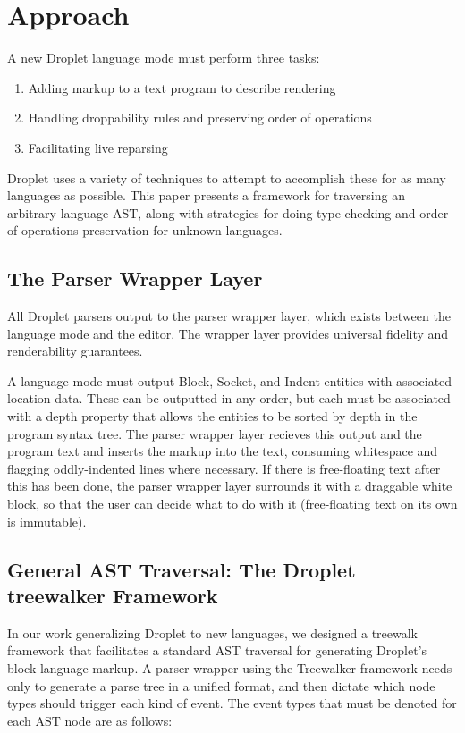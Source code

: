 \documentclass[conference]{IEEEtran}
\begin{document}
\section{Approach}
A new Droplet language mode must perform three tasks:
\begin{enumerate}
  \item Adding markup to a text program to describe rendering
  \item Handling droppability rules and preserving order of operations
  \item Facilitating live reparsing
\end{enumerate}

Droplet uses a variety of techniques to attempt to accomplish these for as many languages as possible. This paper presents a framework for traversing an arbitrary language AST, along with strategies for doing type-checking and order-of-operations preservation for unknown languages.

\subsection{The Parser Wrapper Layer}
All Droplet parsers output to the parser wrapper layer, which exists between the language mode and the editor. The wrapper layer provides universal fidelity and renderability guarantees.

A language mode must output Block, Socket, and Indent entities with associated location data. These can be outputted in any order, but each must be associated with a depth property that allows the entities to be sorted by depth in the program syntax tree. The parser wrapper layer recieves this output and the program text and inserts the markup into the text, consuming whitespace and flagging oddly-indented lines where necessary. If there is free-floating text after this has been done, the parser wrapper layer surrounds it with a draggable white block, so that the user can decide what to do with it (free-floating text on its own is immutable).

\subsection{General AST Traversal: The Droplet treewalker Framework}
In our work generalizing Droplet to new languages, we designed a treewalk framework that facilitates a standard AST traversal for generating Droplet's block-language markup. A parser wrapper using the Treewalker framework needs only to generate a parse tree in a unified format, and then dictate which node types should trigger each kind of event. The event types that must be denoted for each AST node are as follows:
\end{document}
